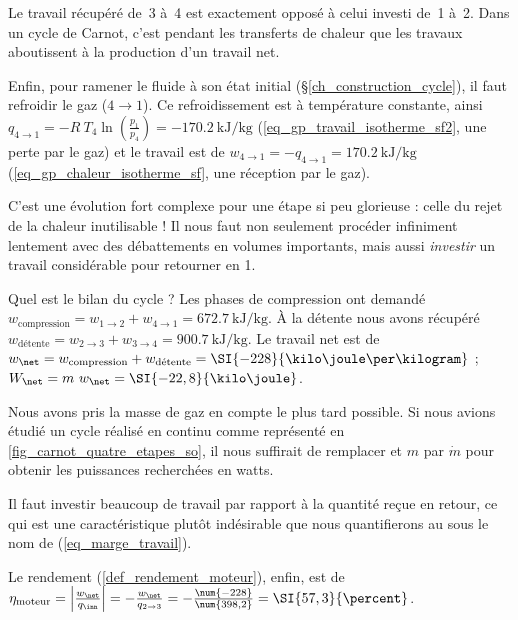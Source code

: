\begin{anexample}
\begin{answer}
				 		\begin{remark}Le travail récupéré de~3 à~4 est exactement opposé à celui investi de~1 à~2. Dans un cycle de Carnot, c’est pendant les transferts de chaleur que les travaux aboutissent à la production d’un travail net.\end{remark}
				 	Enfin, pour ramener le fluide à son état initial (\S\ref{ch_construction_cycle}), il faut refroidir le gaz ($4 \to 1$). Ce refroidissement est à température constante, ainsi $q_{4 \to 1}
				 	= - R \ T_4 \ln\left(\frac{p_1}{p_4}\right)
				 	= \SI{-170,2}{\kilo\joule\per\kilogram}$ (\ref{eq_gp_travail_isotherme_sf2}, une perte par le gaz) et le travail est de $w_{4 \to 1} = - q_{4 \to 1} = \SI{+170,2}{\kilo\joule\per\kilogram}$ (\ref{eq_gp_chaleur_isotherme_sf}, une réception par le gaz).
				 		\begin{remark}C’est une évolution fort complexe pour une étape si peu glorieuse : celle du rejet de la chaleur inutilisable ! Il nous faut non seulement procéder infiniment lentement avec des débattements en volumes importants, mais aussi \emph{investir} un travail considérable pour retourner en 1.\end{remark}
				 	Quel est le bilan du cycle ? Les phases de compression ont demandé $w_\text{compression}
				 	= w_{1\to 2} + w_{4\to 1} = \SI{+672,7}{\kilo\joule\per\kilogram}$.
				 	À la détente nous avons récupéré $w_\text{détente}
				 	= w_{2\to 3} + w_{3\to 4} = \SI{900,7}{\kilo\joule\per\kilogram}$.
				 	Le travail net est de $w_\net
				 	= w_\text{compression} + w_\text{détente} = \SI{-228}{\kilo\joule\per\kilogram}$ ;
				 	$W_\net = m \ w_\net = \SI{-22,8}{\kilo\joule}$.
				 		\begin{remark}Nous avons pris la masse de gaz en compte le plus tard possible. Si nous avions étudié un cycle réalisé en continu comme représenté en \cref{fig_carnot_quatre_etapes_so}, il nous suffirait de remplacer et $m$ par $\dot m$ pour obtenir les puissances recherchées en \si{watts}.\end{remark}
				 		\begin{remark}Il faut investir beaucoup de travail par rapport à la quantité reçue en retour, ce qui est une caractéristique plutôt indésirable que nous quantifierons au \coursdix sous le nom de  (\ref{eq_marge_travail}).\end{remark}
				 	Le rendement (\ref{def_rendement_moteur}), enfin, est de $\eta_\text{moteur}
				 	= \left|\frac{w_\net}{q_\inn}\right|
				 	= -\frac{w_\net}{q_{2 \to 3}}
				 	= -\frac{\num{-228}}{\num{398,2}} = \SI{57,3}{\percent}$.

\end{answer}
\end{anexample}
